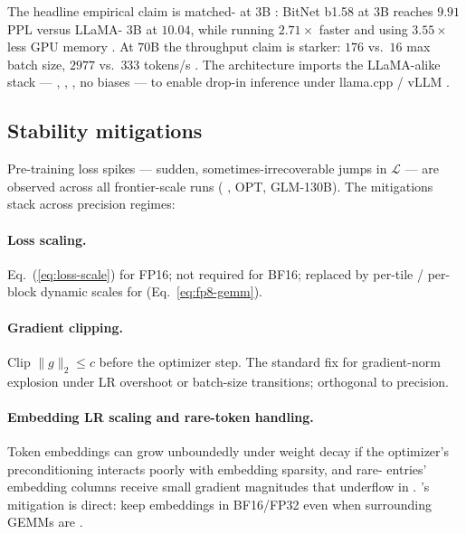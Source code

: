 The headline empirical claim is matched- at 3B
: BitNet b1.58 at 3B reaches $9.91$ PPL versus LLaMA-
3B at $10.04$, while running $2.71\times$ faster and using
$3.55\times$ less GPU memory \citep[\S 3, Table 1]{ma2024-bitnet}.
At $70$B the throughput claim is starker: $176$ vs.\ $16$ max batch
size, $2977$ vs.\ $333$ tokens/s \citep[\S 3, Table 3]{ma2024-bitnet}.
The architecture imports the LLaMA-alike stack — , ,
, no biases — to enable drop-in inference under llama.cpp / vLLM
\citep[\S 2]{ma2024-bitnet}.

\subsection{Stability mitigations}
\label{sec:mp-stability}

Pre-training loss spikes — sudden, sometimes-irrecoverable jumps in
$\mathcal{L}$ — are observed across all frontier-scale runs (
\citep{chowdhery2022}, OPT, GLM-130B). The mitigations stack
across precision regimes:

\paragraph{Loss scaling.} Eq.~(\ref{eq:loss-scale}) for FP16; not
required for BF16; replaced by per-tile / per-block dynamic scales
for  (Eq.~\ref{eq:fp8-gemm}).

\paragraph{Gradient clipping.} Clip $\|g\|_2 \leq c$ before the
optimizer step. The standard fix for gradient-norm explosion under LR
overshoot or batch-size transitions; orthogonal to precision.

\paragraph{Embedding LR scaling and rare-token handling.} Token
embeddings can grow unboundedly under weight decay if the optimizer's
preconditioning interacts poorly with embedding sparsity, and rare-
 entries' embedding columns receive small gradient
magnitudes that underflow in . 's mitigation is direct:
keep embeddings in BF16/FP32 even when surrounding GEMMs are 
\citep[\S 3.3.1]{deepseek-v3}.

